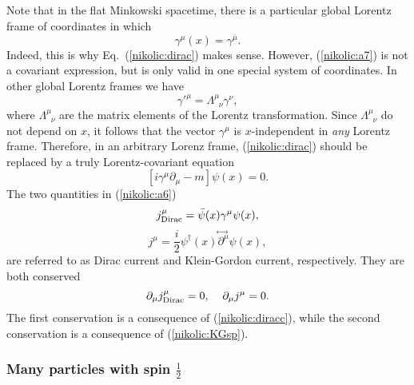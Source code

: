\documentclass[12pt,twoside]{report} %
\begin{document}
Note that in the flat Minkowski spacetime,
there is a particular global Lorentz frame of coordinates in which
\begin{equation}\label{nikolic:a7}
\gamma^{\mu}(x)=\gamma^{\bar{\mu}} .
\end{equation} 
Indeed, this is why Eq.~(\ref{nikolic:dirac}) makes sense. 
However, (\ref{nikolic:a7}) is not a covariant expression, but is only valid in one
special system of coordinates. 
In other global Lorentz frames we have
\begin{equation}
 \gamma'^{\mu}=\Lambda^{\mu}_{\;\;\nu}\gamma^{\nu} ,
\end{equation}
where $\Lambda^{\mu}_{\;\;\nu}$ are the matrix elements of the Lorentz transformation.
Since $\Lambda^{\mu}_{\;\;\nu}$ do not depend on $x$, it follows that 
the vector $\gamma^{\mu}$ is $x$-independent in {\em any} Lorentz frame.
Therefore, in an arbitrary Lorenz frame, (\ref{nikolic:dirac})
should be replaced by a truly Lorentz-covariant equation
\begin{equation}\label{nikolic:diracc}
[i\gamma^{\mu}\partial_{\mu}-m]\psi(x)=0 .
\end{equation}
The two quantities in (\ref{nikolic:a6}) 
\begin{equation}\label{nikolic:a6.1}
j^{\mu}_{\rm Dirac}=
\bar{\psi}(x)\gamma^{\mu}\psi(x) , 
\end{equation}
\begin{equation}\label{nikolic:a6.2}
 j^{\mu}=
\frac{i}{2}\psi^{\dagger}(x)  \!\stackrel{\leftrightarrow\;}{\partial^{\mu}}\!  \psi(x) ,
\end{equation}
are referred to as Dirac current and Klein-Gordon current, respectively.
They are both conserved
\begin{equation}\label{nikolic:a6.3}
 \partial_{\mu}j^{\mu}_{\rm Dirac}=0, \;\;\;\; 
\partial_{\mu}j^{\mu}=0.
\end{equation}
The first conservation is a consequence of (\ref{nikolic:diracc}), while
the second conservation is a consequence of (\ref{nikolic:KGsp}).

\subsubsection{Many particles with spin $\frac{1}{2}$}
\end{document}

